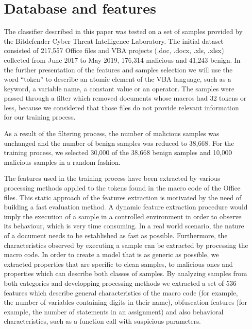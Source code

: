 \section{Database and features}
\par
The classifier described in this paper was tested on a set of samples provided by the Bitdefender Cyber Threat Intelligence Laboratory. The initial dataset consisted of 217,557 Office files and VBA projects (.doc, .docx, .xls, .xlsx) collected from June 2017 to May 2019, 176,314 malicious and 41,243 benign. In the further presentation of the features and samples selection we will use the word “token” to describe an atomic element of the VBA language, such as a keyword, a variable name, a constant value or an operator. The samples were passed through a filter which removed documents whose macros had 32 tokens or less,  because we considered that those files do not provide relevant information for our training process. 
\par
As a result of the filtering process, the number of malicious samples was unchanged and the number of benign samples was reduced to 38,668. For the training process, we selected 30,000 of the 38,668 benign samples and 10,000 malicious samples in a random fashion.
\par
The features used in the training process have been extracted by various processing methods applied to the tokens found in the macro code of the Office files. This static approach of the features extraction is motivated by the need of building a fast evaluation method. A dynamic feature extraction procedure would imply the execution of a sample in a controlled environment in order to observe its behaviour, which is very time consuming. In a real world scenario, the nature of a document needs to be established as fast as possible. Furthermore, the characteristics observed by executing a sample can be extracted by processing the macro code.  In order to create a model that is as generic as possible, we extracted properties that are specific to clean samples, to malicious ones and properties which can describe both classes of samples. By analyzing samples from both categories and developping processing methods we extracted a set of 536 features which describe general characteristics of the macro code (for example, the number of variables containing digits in their name), obfuscation features (for example, the number of statements in an assignment) and also behavioral characteristics, such as a function call with suspicious parameters.
\par
